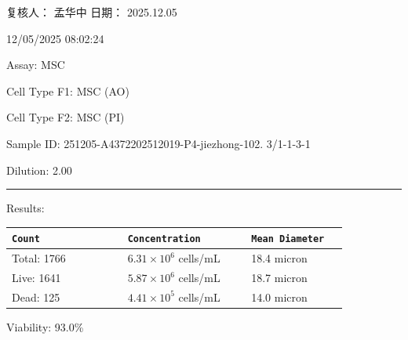 \documentclass[UTF8,10pt,a4paper,fontset=fandol]{ctexart}
\newcommand{\fieldvalue}[1]{#1}
\newcommand{\handwritten}[1]{#1}
\begin{document}
\noindent
复核人：
\fieldvalue{\handwritten{孟华中}}
\hfill
日期：
\fieldvalue{\handwritten{2025.12.05}}

\newpage

\begin{flushright}
12/05/2025 08:02:24
\end{flushright}

\noindent
Assay: MSC

\noindent
Cell Type F1: MSC (AO)

\noindent
Cell Type F2: MSC (PI)

\medskip

\noindent
Sample ID: 251205-A4372202512019-P4-jiezhong-102. 3/1-1-3-1

\noindent
Dilution: 2.00

\noindent\rule{\linewidth}{0.4pt}

\medskip

\noindent
Results:

\begin{center}
\begin{tabular}{p{0.30\linewidth}p{0.32\linewidth}p{0.25\linewidth}}
\texttt{Count} & \texttt{Concentration} & \texttt{Mean Diameter} \\
\hline
Total: 1766 & $6.31\times10^{6}$ cells/mL & 18.4 micron \\
Live: 1641 & $5.87\times10^{6}$ cells/mL & 18.7 micron \\
Dead: 125 & $4.41\times10^{5}$ cells/mL & 14.0 micron
\end{tabular}
\end{center}

\medskip

\noindent
Viability: 93.0\%

\medskip

\begin{center}
\hspace{0.16\linewidth}
\end{center}

\vspace{0.05\textheight}
\end{document}
